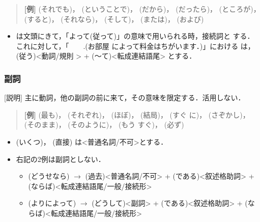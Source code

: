 \begin{quote}
{\bf [例]}
(それでも)，
(ということで)，
(だから)，
(だったら)，
(ところが)，
(すると)，
(それなら)，
(そして)，
(または)，
(および)
\end{quote}

\begin{itemize}
\item 
{}
 は文頭にきて，「よって(従って)」の意味で用いられる時，接続詞と
する．これに対して，「
 \underline{
}\ 
\ 
.(お部屋
によって料金はちがいます．)」における 
 は， 
(従う)<動詞/規則
> + 
(〜て)<転成連結語尾> とする．
\end{itemize}        


\subsubsection{副詞}
[説明] 主に動詞，他の副詞の前に来て，その意味を限定する．活用しない．

\begin{quote}        
{\bf [例]}
(最も)，
(それぞれ)，
(ほぼ)，
(結局)，
(すぐ
に)，
(さぞかし)，
(そのまま)，
(そのように)，
(もう
すぐ)，
(必ず)
\end{quote}

\begin{itemize}        
\item {}
(いくつ)，
(直接) は<普通名詞/不可>とする．

\item 右記の2例は副詞としない．
    \begin{itemize}
    \item  {}
(どうせなら) $\longrightarrow$ 
(過去)<普通名詞/不可> + 
(である)<叙述格助詞> + 
(ならば)<転成連結語尾/一般/接続形>
    \item {}
(よりによって)  $\longrightarrow$
(どうして)<副詞> + 
(である)<叙述格助詞> + 
(ならば)<転成連結語尾/一般/接続形>
    \end{itemize}
\end{itemize}

